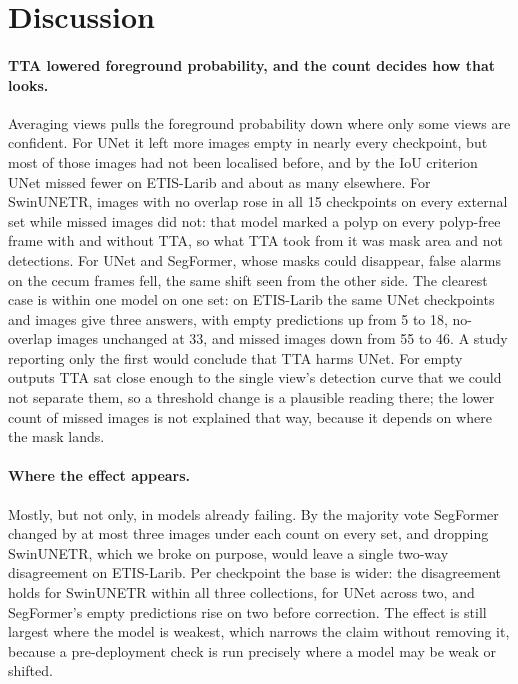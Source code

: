 \section{Discussion}
\label{sec:discussion}

\paragraph{TTA lowered foreground probability, and the count decides how that looks.} Averaging views pulls the foreground probability down where only some views are confident. For UNet it left more images empty in nearly every checkpoint, but most of those images had not been localised before, and by the IoU criterion UNet missed fewer on ETIS-Larib and about as many elsewhere. For SwinUNETR, images with no overlap rose in all 15 checkpoints on every external set while missed images did not: that model marked a polyp on every polyp-free frame with and without TTA, so what TTA took from it was mask area and not detections. For UNet and SegFormer, whose masks could disappear, false alarms on the cecum frames fell, the same shift seen from the other side. The clearest case is within one model on one set: on ETIS-Larib the same UNet checkpoints and images give three answers, with empty predictions up from 5 to 18, no-overlap images unchanged at 33, and missed images down from 55 to 46. A study reporting only the first would conclude that TTA harms UNet. For empty outputs TTA sat close enough to the single view's detection curve that we could not separate them, so a threshold change is a plausible reading there; the lower count of missed images is not explained that way, because it depends on where the mask lands.

\paragraph{Where the effect appears.} Mostly, but not only, in models already failing. By the majority vote SegFormer changed by at most three images under each count on every set, and dropping SwinUNETR, which we broke on purpose, would leave a single two-way disagreement on ETIS-Larib. Per checkpoint the base is wider: the disagreement holds for SwinUNETR within all three collections, for UNet across two, and SegFormer's empty predictions rise on two before correction. The effect is still largest where the model is weakest, which narrows the claim without removing it, because a pre-deployment check is run precisely where a model may be weak or shifted.

